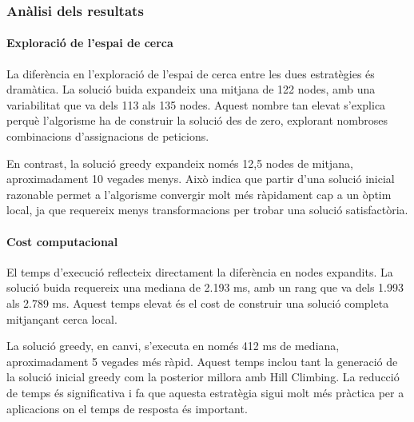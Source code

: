 \vspace{0.5cm}


\subsubsection{Anàlisi dels resultats}

\paragraph{Exploració de l'espai de cerca}

\vspace{0.5cm}

\vspace{0.5cm}

La diferència en l'exploració de l'espai de cerca entre les dues estratègies és dramàtica. La solució buida expandeix una mitjana de 122 nodes, amb una variabilitat que va dels 113 als 135 nodes. Aquest nombre tan elevat s'explica perquè l'algorisme ha de construir la solució des de zero, explorant nombroses combinacions d'assignacions de peticions.

En contrast, la solució greedy expandeix només 12,5 nodes de mitjana, aproximadament 10 vegades menys. Això indica que partir d'una solució inicial razonable permet a l'algorisme convergir molt més ràpidament cap a un òptim local, ja que requereix menys transformacions per trobar una solució satisfactòria.

\paragraph{Cost computacional}

\vspace{0.5cm}

\vspace{0.5cm}

El temps d'execució reflecteix directament la diferència en nodes expandits. La solució buida requereix una mediana de 2.193 ms, amb un rang que va dels 1.993 als 2.789 ms. Aquest temps elevat és el cost de construir una solució completa mitjançant cerca local.

La solució greedy, en canvi, s'executa en només 412 ms de mediana, aproximadament 5 vegades més ràpid. Aquest temps inclou tant la generació de la solució inicial greedy com la posterior millora amb Hill Climbing. La reducció de temps és significativa i fa que aquesta estratègia sigui molt més pràctica per a aplicacions on el temps de resposta és important.

